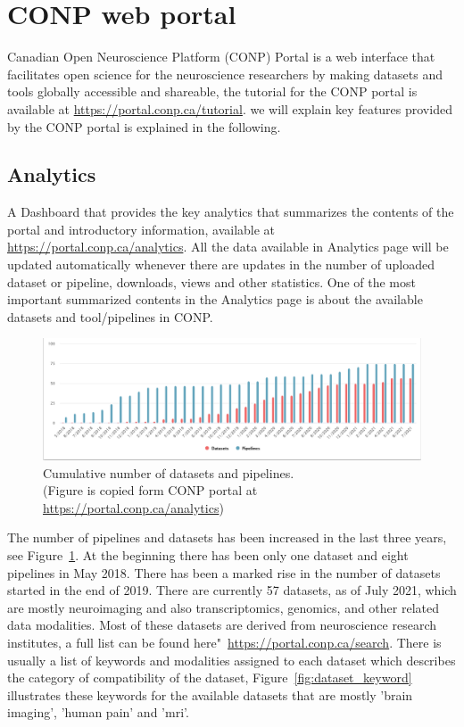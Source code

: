  









\section{CONP web portal}

Canadian Open Neuroscience Platform (CONP) Portal is a web interface that facilitates open science for the neuroscience researchers by making datasets and tools globally accessible and shareable, the tutorial for the CONP portal is available at \url{https://portal.conp.ca/tutorial}. we will explain key features provided by the CONP portal is explained in the following. 

\subsection{Analytics}
A Dashboard that provides the key analytics that summarizes the  contents of the portal and introductory information, available at \url{https://portal.conp.ca/analytics}. All the data available in Analytics page will be updated automatically whenever there are updates in the number of uploaded dataset or pipeline, downloads, views and other statistics. One of the most important summarized contents in the Analytics page is about the available datasets and tool/pipelines in CONP.

\begin{figure}[ht]
  \centering
  \includegraphics[width=\textwidth,height=\textheight,keepaspectratio]{figures/PipeDataTime.png}
  \caption{Cumulative number of datasets and pipelines. \\(Figure is copied form CONP portal at \url{https://portal.conp.ca/analytics})}
  \label{fig:cumulative}
  \end{figure}

The number of pipelines and datasets has been increased in the last three years, see Figure~\ref{fig:cumulative}. At the beginning there has been only one dataset and eight pipelines in May 2018. There has been a marked rise in the number of datasets started in the end of 2019.
There are currently 57 datasets, as of July 2021, which are mostly neuroimaging and also transcriptomics, genomics, and other related data modalities. Most of these datasets are derived from neuroscience research institutes, a full list can be found here"~\url{https://portal.conp.ca/search}. There is usually a list of keywords and modalities assigned to each dataset which describes the category of compatibility of the dataset, Figure~\ref{fig:dataset_keyword} illustrates these keywords for the available datasets that are mostly 'brain imaging', 'human pain' and 'mri'. 

